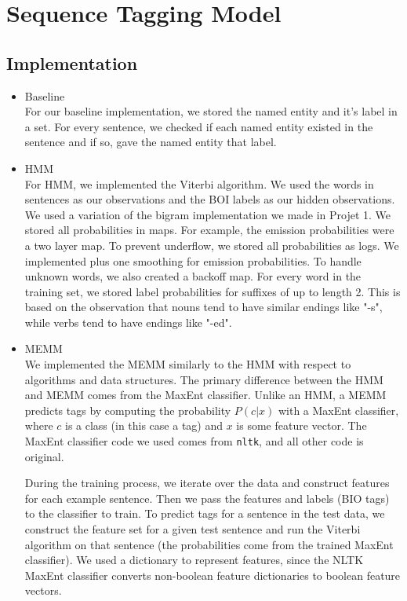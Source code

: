 \documentclass[12pt]{article}
\begin{document}
\maketitle

\section{Sequence Tagging Model}
\subsection{Implementation}
\begin{itemize}
\item Baseline\\
For our baseline implementation, we stored the named entity and it's label in a set. For every sentence, we checked if each named entity existed in the sentence and if so, gave the named entity that label.
\item HMM\\
For HMM, we implemented the Viterbi algorithm. We used the words in sentences as our observations and the BOI labels as our hidden observations. We used a variation of the bigram implementation we made in Projet 1. We stored all probabilities in maps. For example, the emission probabilities were a two layer map. To prevent underflow, we stored all probabilities as logs. We implemented plus one smoothing for emission probabilities. To handle unknown words, we also created a backoff map. For every word in the training set, we stored label probabilities for suffixes of up to length 2. This is based on the observation that nouns tend to have similar endings like "-s", while verbs tend to have endings like "-ed".
\item MEMM\\
We implemented the MEMM similarly to the HMM with respect to algorithms and data structures. The primary difference between the HMM and MEMM comes from the MaxEnt classifier. Unlike an HMM, a MEMM predicts tags by computing the probability $P(c|x)$ with a MaxEnt classifier, where $c$ is a class (in this case a tag) and $x$ is some feature vector. The MaxEnt classifier code we used comes from {\tt nltk}, and all other code is original.

During the training process, we iterate over the data and construct features for each example sentence. Then we pass the features and labels (BIO tags) to the classifier to train. To predict tags for a sentence in the test data, we construct the feature set for a given test sentence and run the Viterbi algorithm on that sentence (the probabilities come from the trained MaxEnt classifier). We used a dictionary to represent features, since the NLTK MaxEnt classifier converts non-boolean feature dictionaries to boolean feature vectors.


\end{itemize}
\end{document}
